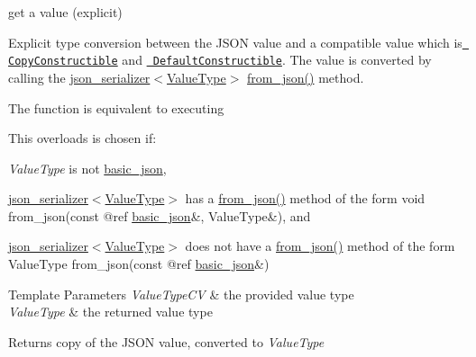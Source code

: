 get a value (explicit) 

Explicit type conversion between the J\+S\+ON value and a compatible value which is \href{http://en.cppreference.com/w/cpp/concept/CopyConstructible}{\texttt{ Copy\+Constructible}} and \href{http://en.cppreference.com/w/cpp/concept/DefaultConstructible}{\texttt{ Default\+Constructible}}. The value is converted by calling the \mbox{\hyperlink{classnlohmann_1_1basic__json_a7768841baaaa7a21098a401c932efaff}{json\+\_\+serializer$<$\+Value\+Type$>$}} {\ttfamily \mbox{\hyperlink{namespacenlohmann_1_1detail_a839b0ab50d2c9bce669068f56bc41202}{from\+\_\+json()}}} method.

The function is equivalent to executing 
\begin{DoxyCode}{0}
\end{DoxyCode}


This overloads is chosen if\+:
\begin{DoxyItemize}
\item {\itshape Value\+Type} is not \mbox{\hyperlink{classnlohmann_1_1basic__json}{basic\+\_\+json}},
\item \mbox{\hyperlink{classnlohmann_1_1basic__json_a7768841baaaa7a21098a401c932efaff}{json\+\_\+serializer$<$\+Value\+Type$>$}} has a {\ttfamily \mbox{\hyperlink{namespacenlohmann_1_1detail_a839b0ab50d2c9bce669068f56bc41202}{from\+\_\+json()}}} method of the form {\ttfamily void from\+\_\+json(const @ref \mbox{\hyperlink{classnlohmann_1_1basic__json}{basic\+\_\+json}}\&, Value\+Type\&)}, and
\item \mbox{\hyperlink{classnlohmann_1_1basic__json_a7768841baaaa7a21098a401c932efaff}{json\+\_\+serializer$<$\+Value\+Type$>$}} does not have a {\ttfamily \mbox{\hyperlink{namespacenlohmann_1_1detail_a839b0ab50d2c9bce669068f56bc41202}{from\+\_\+json()}}} method of the form {\ttfamily Value\+Type from\+\_\+json(const @ref \mbox{\hyperlink{classnlohmann_1_1basic__json}{basic\+\_\+json}}\&)}
\end{DoxyItemize}


\begin{DoxyTemplParams}{Template Parameters}
{\em Value\+Type\+CV} & the provided value type \\
\hline
{\em Value\+Type} & the returned value type\\
\hline
\end{DoxyTemplParams}
\begin{DoxyReturn}{Returns}
copy of the J\+S\+ON value, converted to {\itshape Value\+Type} 
\end{DoxyReturn}

